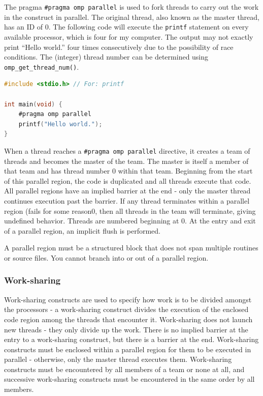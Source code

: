 \documentclass[10pt]{article}
\begin{document}
\begin{flushleft}
The pragma {\tt \#pragma omp parallel} is used to fork threads to carry out the work in the construct in parallel. The original thread, also known as the master thread, has an ID of 0. The following code will execute the {\tt printf} statement on every available processor, which is four for my computer. The output may not exactly print ``Hello world.'' four times consecutively due to the possibility of race conditions. The (integer) thread number can be determined using {\tt omp\_get\_thread\_num()}.

\begin{lstlisting}[language=C, basicstyle=\ttfamily\small]
#include <stdio.h> // For: printf

int main(void) {
	#pragma omp parallel
	printf("Hello world.");
}
\end{lstlisting}

When a thread reaches a {\tt \#pragma omp parallel} directive, it creates a team of threads and becomes the master of the team. The master is itself a member of that team and has thread number 0 within that team. Beginning from the start of this parallel region, the code is duplicated and all threads execute that code. All parallel regions have an implied barrier at the end - only the master thread continues execution past the barrier. If any thread terminates within a parallel region (fails for some reason0, then all threads in the team will terminate, giving undefined behavior. Threads are numbered beginning at 0. At the entry and exit of a parallel region, an implicit flush is performed.

A parallel region must be a structured block that does not span multiple routines or source files. You cannot branch into or out of a parallel region. 

\subsubsection{Work-sharing}

Work-sharing constructs are used to specify how work is to be divided amongst the processors - a work-sharing construct divides the execution of the enclosed code region among the threads that encounter it. Work-sharing does not launch new threads - they only divide up the work. There is no implied barrier at the entry to a work-sharing construct, but there is a barrier at the end. Work-sharing constructs must be enclosed within a parallel region for them to be executed in parallel - otherwise, only the master thread executes them. Work-sharing constructs must be encountered by all members of a team or none at all, and successive work-sharing constructs must be encountered in the same order by all members. 


\end{flushleft}
\end{document}
